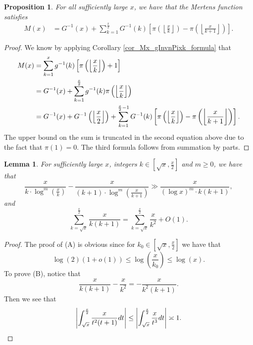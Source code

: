 \documentclass[11pt,reqno,a4letter]{article}
\numberwithin{figure}{section}
\numberwithin{table}{section}
\newcommand{\Floor}[2]{\ensuremath{\left\lfloor \frac{#1}{#2} \right\rfloor}}
\theoremstyle{plain}
\newtheorem{prop}[theorem]{Proposition}
\newtheorem{lemma}[theorem]{Lemma}
\numberwithin{theorem}{section}
\theoremstyle{definition}
\begin{document}
\begin{prop} 
\label{prop_Mx_SBP_IntegralFormula} 
For all sufficiently large $x$, we have that the Mertens function satisfies 
\begin{align} 
\label{eqn_pf_tag_v2-restated_v2} 
M(x) & = G^{-1}(x) + 
     \sum_{k=1}^{\frac{x}{2}} G^{-1}(k) \left[ 
     \pi\left(\Floor{x}{k}\right) - \pi\left(\Floor{x}{k+1}\right) 
     \right]. 
\end{align} 
\end{prop} 
\begin{proof} 
We know by applying Corollary \ref{cor_Mx_gInvnPixk_formula} that 
\begin{align} 
\notag
M(x) & = \sum_{k=1}^{x} g^{-1}(k) \left[\pi\left(\Floor{x}{k}\right)+1\right] \\ 
\notag 
     & = G^{-1}(x) + \sum_{k=1}^{\frac{x}{2}} g^{-1}(k) \pi\left(\Floor{x}{k}\right) \\ 
\notag 
     & = G^{-1}(x) + G^{-1}\left(\Floor{x}{2}\right) + 
     \sum_{k=1}^{\frac{x}{2}-1} G^{-1}(k) \left[ 
     \pi\left(\Floor{x}{k}\right) - \pi\left(\Floor{x}{k+1}\right) 
     \right].
\end{align} 
The upper bound on the sum is truncated in the second equation 
above due to the fact that $\pi(1) = 0$. 
The third formula follows from summation by parts. 
\end{proof} 

\begin{lemma}
\label{lemma_PrimePix_ErrorBoundDiffs_SimplifyingConditions_v1} 
For sufficiently large $x$, integers $k \in \left[\sqrt{x}, \frac{x}{2}\right]$ and 
$m \geq 0$, we have that 
\begin{equation} 
\tag{A} 
\frac{x}{k \cdot \log^m\left(\frac{x}{k}\right)} - 
     \frac{x}{(k+1) \cdot \log^m\left(\frac{x}{k+1}\right)}
     \gg \frac{x}{(\log x)^m \cdot k(k+1)}, 
\end{equation} 
and 
\begin{equation} 
\tag{B} 
\sum_{k=\sqrt{x}}^{\frac{x}{2}} \frac{x}{k(k+1)} = 
     \sum_{k=\sqrt{x}}^{\frac{x}{2}} \frac{x}{k^2} + O(1). 
\end{equation} 
\end{lemma} 
\begin{proof} 
The proof of (A) is obvious since for $k_0 \in \left[\sqrt{x}, \frac{x}{2}\right]$ we have that 
\[
\log(2) (1 + o(1)) \leq \log\left(\frac{x}{k_0}\right) \leq \log(x). 
\]
To prove (B), notice that 
\[
\frac{x}{k(k+1)} - \frac{x}{k^2} = -\frac{x}{k^2(k+1)}. 
\]
Then we see that 
\[
\left\lvert \int_{\sqrt{x}}^{\frac{x}{2}} \frac{x}{t^2(t+1)} dt \right\rvert \leq 
     \left\lvert \int_{\sqrt{x}}^{\frac{x}{2}} \frac{x}{t^3} dt \right\rvert \asymp 1. 
     \qedhere 
\]
\end{proof} 
\end{document}
